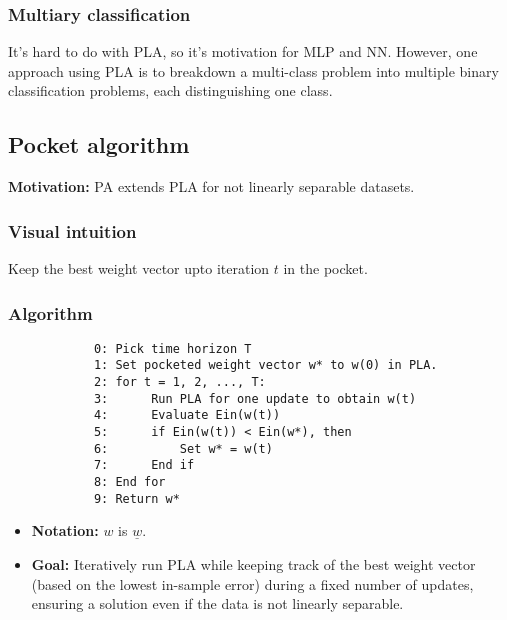     \subsubsection{Multiary classification}
    \begin{intuition}
        It's hard to do with PLA, so it's motivation for MLP and NN. However, one approach using PLA is to breakdown a multi-class problem into multiple binary classification problems, each distinguishing one class.
    \end{intuition}

\subsection{Pocket algorithm}
\textbf{Motivation:} PA extends PLA for not linearly separable datasets.

    \subsubsection{Visual intuition}
    \begin{intuition}
        Keep the best weight vector upto iteration $t$ in the pocket.
    \end{intuition}

    \subsubsection{Algorithm}
    \begin{definition}
        \begin{verbatim}
            0: Pick time horizon T 
            1: Set pocketed weight vector w* to w(0) in PLA.
            2: for t = 1, 2, ..., T:
            3:      Run PLA for one update to obtain w(t)
            4:      Evaluate Ein(w(t))
            5:      if Ein(w(t)) < Ein(w*), then
            6:          Set w* = w(t)
            7:      End if
            8: End for
            9: Return w*
        \end{verbatim}
        \begin{itemize}
            \item \textbf{Notation:} $w$ is $\underline{w}$.
            \item \textbf{Goal:} Iteratively run PLA while keeping track of the best weight vector (based on the lowest in-sample error) during a fixed number of updates, ensuring a solution even if the data is not linearly separable.
        \end{itemize}
    \end{definition}

